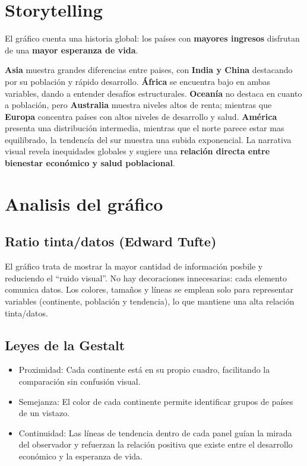 \documentclass{../../../miPlantilla}
\begin{document}
\maketitle

\section{Storytelling}
El gráfico cuenta una historia global: los países con \textbf{mayores ingresos} disfrutan de una \textbf{mayor esperanza de vida}.


\textbf{Asia} muestra grandes diferencias entre paises, con \textbf{India y China} destacando por su población y rápido desarrollo.
\textbf{África} se encuentra bajo en ambas variables, dando a entender desafíos estructurales. \textbf{Oceanía} no destaca en cuanto
a población, pero \textbf{Australia} muestra niveles altos de renta; mientras que \textbf{Europa} concentra países con altos
niveles de desarrollo y salud. \textbf{América} presenta una distribución intermedia, mientras que el norte parece estar mas equilibrado,
la tendencía del sur muestra una subida exponencial.
La narrativa visual revela inequidades globales y sugiere una \textbf{relación directa entre bienestar económico y salud poblacional}.

\newpage

\section{Analisis del gráfico}


\subsection{Ratio tinta/datos (Edward Tufte)}
El gráfico trata de mostrar la mayor cantidad de información posbile y reduciendo el “ruido visual”. No hay decoraciones
innecesarias: cada elemento comunica datos. Los colores, tamaños y líneas se emplean solo para representar variables (continente,
población y tendencia), lo que mantiene una alta relación tinta/datos.

\subsection{Leyes de la Gestalt}

\begin{itemize}
    \item Proximidad: Cada continente está en su propio cuadro, facilitando la comparación sin confusión visual.
    \item Semejanza: El color de cada continente permite identificar grupos de países de un vistazo.
    \item Continuidad: Las líneas de tendencia dentro de cada panel guían la mirada del observador y refuerzan la relación
            positiva que existe entre el desarrollo económico y la esperanza de vida.
\end{itemize}
\end{document}
